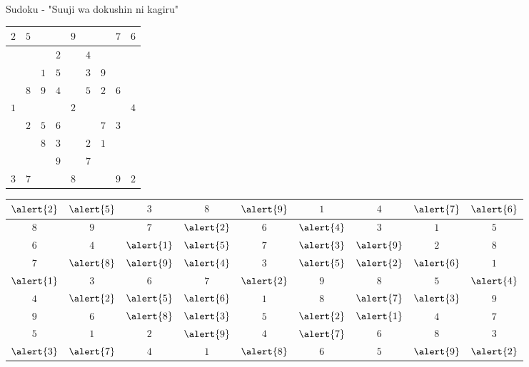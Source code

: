 \begin{frame}{Sudoku - "Suuji  wa dokushin ni kagiru"}
\begin{tabular}{|c|c|c||c|c|c||c|c|c|} \hline
$2$ & $5$ &  &  & $9$ &  &  & $7$ & $6$ \\ \hline
 &  &  & $2$ &  & $4$ &  &  &  \\ \hline
 &  & $1$ & $5$ &  & $3$ & $9$ &  &  \\ \hline\hline
 & $8$ & $9$ & $4$   &  & $5$ & $2$ & $6$ &  \\ \hline
$1$ &  &  &  & $2$ &  &  &  & $4$ \\ \hline
 & $2$ & $5$ & $6$ &  &  & $7$ & $3$ &  \\ \hline\hline
 &  & $8$ & $3$ &  & $2$ & $1$ &  &  \\ \hline
 &  &  & $9$ &  & $7$ &  &  &  \\ \hline
$3$ & $7$ &  &  & $8$ &  &  & $9$ & $2$ \\ \hline
\end{tabular}
\hfill
\begin{tabular}{|c|c|c||c|c|c||c|c|c|} \hline
$\alert{2}$ & $\alert{5}$ & $3$ & $8$ & $\alert{9}$ & $1$ & $4$ & $\alert{7}$ & $\alert{6}$ \\ \hline
$8$ & $9$ & $7$ & $\alert{2}$ & $6$ & $\alert{4}$ & $3$ & $1$ & $5$ \\ \hline
$6$ & $4$ & $\alert{1}$ & $\alert{5}$ & $7$ & $\alert{3}$ & $\alert{9}$ & $2$ & $8$ \\ \hline\hline
$7$ & $\alert{8}$ & $\alert{9}$ & $\alert{4}$ & $3$ & $\alert{5}$ & $\alert{2}$ & $\alert{6}$ & $1$ \\ \hline
$\alert{1}$ & $3$ & $6$ & $7$ & $\alert{2}$ & $9$ & $8$ & $5$ & $\alert{4}$ \\ \hline
$4$ & $\alert{2}$ & $\alert{5}$ & $\alert{6}$ & $1$ & $8$ & $\alert{7}$ & $\alert{3}$ & $9$ \\ \hline\hline
$9$ & $6$ & $\alert{8}$ & $\alert{3}$ & $5$ & $\alert{2}$ & $\alert{1}$ & $4$ & $7$ \\ \hline
$5$ & $1$ & $2$ & $\alert{9}$ & $4$ & $\alert{7}$ & $6$ & $8$ & $3$ \\ \hline
$\alert{3}$ & $\alert{7}$ & $4$ & $1$ & $\alert{8}$ & $6$ & $5$ & $\alert{9}$ & $\alert{2}$ \\ \hline
\end{tabular}

\end{frame}

